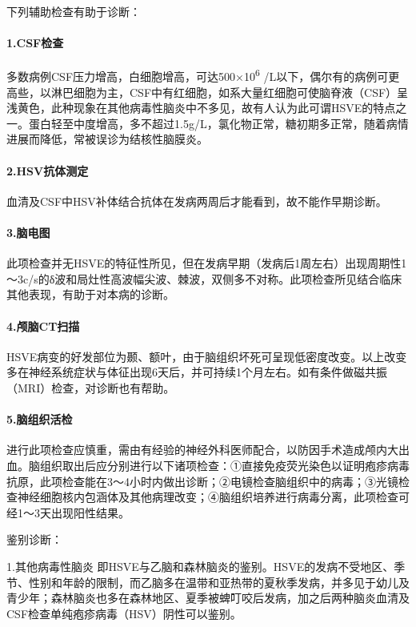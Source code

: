 下列辅助检查有助于诊断：

\paragraph{1.CSF检查}

多数病例CSF压力增高，白细胞增高，可达500×10\textsuperscript{6}
/L以下，偶尔有的病例可更高些，以淋巴细胞为主，CSF中有红细胞，如系大量红细胞可使脑脊液（CSF）呈浅黄色，此种现象在其他病毒性脑炎中不多见，故有人认为此可谓HSVE的特点之一。蛋白轻至中度增高，多不超过1.5g/L，氯化物正常，糖初期多正常，随着病情进展而降低，常被误诊为结核性脑膜炎。

\paragraph{2.HSV抗体测定}

血清及CSF中HSV补体结合抗体在发病两周后才能看到，故不能作早期诊断。

\paragraph{3.脑电图}

此项检查并无HSVE的特征性所见，但在发病早期（发病后1周左右）出现周期性1～3c/s的δ波和局灶性高波幅尖波、棘波，双侧多不对称。此项检查所见结合临床其他表现，有助于对本病的诊断。

\paragraph{4.颅脑CT扫描}

HSVE病变的好发部位为颞、额叶，由于脑组织坏死可呈现低密度改变。以上改变多在神经系统症状与体征出现6天后，并可持续1个月左右。如有条件做磁共振（MRI）检查，对诊断也有帮助。

\paragraph{5.脑组织活检}

进行此项检查应慎重，需由有经验的神经外科医师配合，以防因手术造成颅内大出血。脑组织取出后应分别进行以下诸项检查：①直接免疫荧光染色以证明疱疹病毒抗原，此项检查能在3～4小时内做出诊断；②电镜检查脑组织中的病毒；③光镜检查神经细胞核内包涵体及其他病理改变；④脑组织培养进行病毒分离，此项检查可经1～3天出现阳性结果。

鉴别诊断：

1.其他病毒性脑炎
即HSVE与乙脑和森林脑炎的鉴别。HSVE的发病不受地区、季节、性别和年龄的限制，而乙脑多在温带和亚热带的夏秋季发病，并多见于幼儿及青少年；森林脑炎也多在森林地区、夏季被蜱叮咬后发病，加之后两种脑炎血清及CSF检查单纯疱疹病毒（HSV）阴性可以鉴别。

